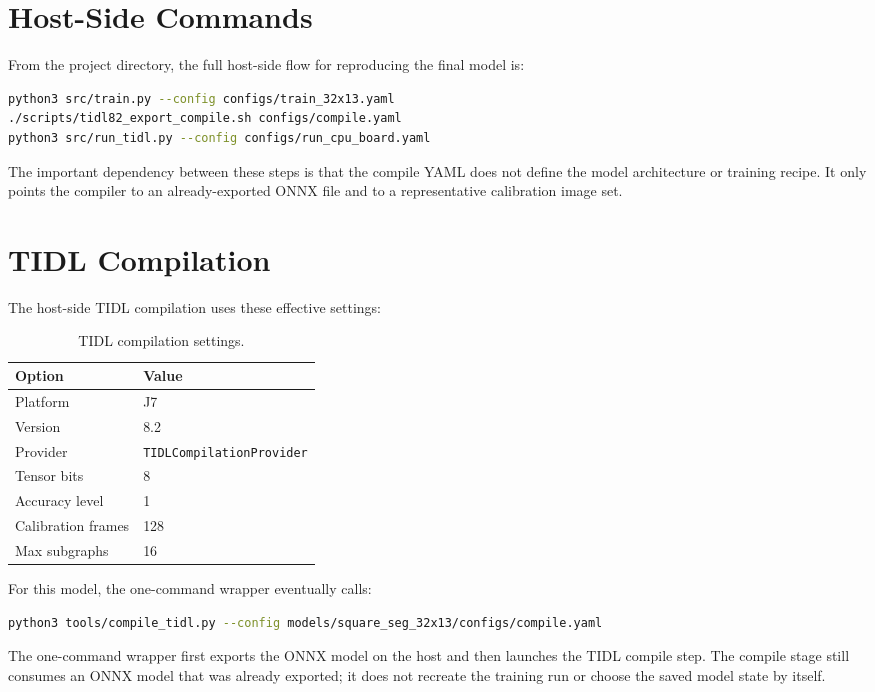 \documentclass[11pt,a4paper]{article}
\begin{document}
\section{Host-Side Commands}

From the project directory, the full host-side flow for reproducing the final model is:

\begin{lstlisting}[language=bash]
python3 src/train.py --config configs/train_32x13.yaml
./scripts/tidl82_export_compile.sh configs/compile.yaml
python3 src/run_tidl.py --config configs/run_cpu_board.yaml
\end{lstlisting}

The important dependency between these steps is that the compile YAML does not define the model architecture or training recipe.  It only points the compiler to an already-exported ONNX file and to a representative calibration image set.

\section{TIDL Compilation}

The host-side TIDL compilation uses these effective settings:

\begin{table}[H]
\centering
\caption{TIDL compilation settings.}
\begin{tabular}{ll}
\toprule
Option & Value \\
\midrule
Platform & J7 \\
Version & 8.2 \\
Provider & \texttt{TIDLCompilationProvider} \\
Tensor bits & 8 \\
Accuracy level & 1 \\
Calibration frames & 128 \\
Max subgraphs & 16 \\
\bottomrule
\end{tabular}
\end{table}

For this model, the one-command wrapper eventually calls:

\begin{lstlisting}[language=bash]
python3 tools/compile_tidl.py --config models/square_seg_32x13/configs/compile.yaml
\end{lstlisting}

The one-command wrapper first exports the ONNX model on the host and then launches the TIDL compile step. The compile stage still consumes an ONNX model that was already exported; it does not recreate the training run or choose the saved model state by itself.
\end{document}
